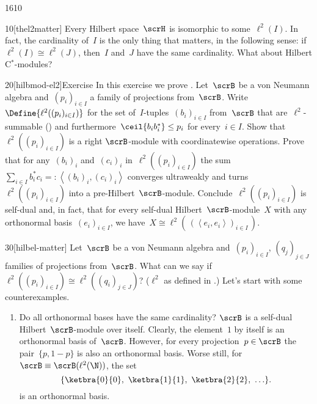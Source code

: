 \begin{parsec}{1610}%
\begin{point}{10}[thel2matter]%
Every Hilbert space~$\scrH$ is isomorphic to some~$\ell^2(I)$.
In fact, the cardinality of~$I$ is the only thing that matters,
    in the following sense:
    if~$\ell^2(I) \cong \ell^2(J)$, then~$I$ and~$J$
    have the same cardinality.
What about Hilbert C$^*$-modules?
\end{point}
\begin{point}{20}[hilbmod-el2]{Exercise}%
In this exercise we prove \cite[thm.~3.12]{paschke}.
Let~$\scrB$ be a von Neumann algebra
    and~$(p_i)_{i \in I}$
    a family of projections from~$\scrB$.
    Write~$\Define{\ell^2((p_i)_{i \in I})}$
    for the set of~$I$-tuples~$(b_i)_{i \in I}$
    from~$\scrB$ that are~$\ell^2$-summable ()
    and furthermore~$\ceil{b_ib_i^*} \leq p_i$ for every~$i \in I$.
Show that~$\ell^2((p_i)_{i \in I})$
    is a right $\scrB$-module
    with coordinatewise operations.
Prove that for any~$(b_i)_i$ and~$(c_i)_i$
    in~$\ell^2((p_i)_{i \in I})$
    the sum~$\sum_{i \in I} b_i^* c_i =: \left<(b_i)_i, (c_i)_i\right>$
    converges ultraweakly
    and turns~$\ell^2((p_i)_{i\in I})$ into a pre-Hilbert~$\scrB$-module.
    Conclude~$\ell^2((p_i)_{i \in I})$ is self-dual
and, in fact, that for every self-dual Hilbert~$\scrB$-module~$X$
    with any orthonormal basis~$(e_i)_{i \in I}$,
    we have~$X \cong \ell^2(\,(\left<e_i,e_i\right>)_{i \in I}\,)$.
\end{point}

\begin{point}{30}[hilbel-matter]%
    Let~$\scrB$ be a von Neumann algebra
        and~$(p_i)_{i \in I}$, $(q_j)_{j \in J}$
        families of projections from~$\scrB$.
    What can we say if~$\ell^2((p_i)_{i \in I}) 
    \cong \ell^2((q_i)_{j \in J})$?
    ($\ell^2$ as defined in .)
    Let's start with some counterexamples.
\begin{enumerate}
\item
Do all orthonormal bases have the same cardinality?
$\scrB$ is a self-dual Hilbert~$\scrB$-module over itself.
Clearly, the element~$1$ by itself is an orthonormal basis of~$\scrB$.
However, for every projection~$p \in \scrB$
        the pair~$\{ p,1-p \}$ is also an orthonormal basis.
    Worse still, for~$\scrB \equiv \scrB(\ell^2(\N))$,
        the set
\begin{equation*}
    \{\ketbra{0}{0}, \ \ketbra{1}{1},\  \ketbra{2}{2},\  \ldots \}.
\end{equation*}
is an orthonormal basis.


\end{enumerate}
\end{point}
\end{parsec}
